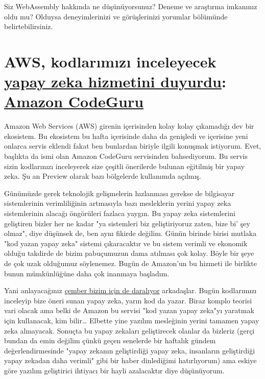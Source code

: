 \documentclass[11pt]{article}
\begin{document}
Siz WebAssembly hakkında ne düşünüyorsunuz? Deneme ve araştırma imkanınız oldu
mu? Olduysa deneyimlerinizi ve görüşlerinizi yorumlar bölümünde
belirtebilirsiniz.
\section{AWS, kodlarımızı inceleyecek \href{https://aws.amazon.com/about-aws/whats-new/2019/12/aws-announces-amazon-codeguru-for-automated-code-reviews-and-application-performance-recommendations/}{yapay zeka hizmetini duyurdu}: \href{https://aws.amazon.com/tr/codeguru/}{Amazon CodeGuru}}
\label{sec:orgfa6e881}
Amazon Web Services (AWS) girenin içerisinden kolay kolay çıkamadığı dev bir
ekosistem. Bu ekosistem bu hafta içerisinde daha da genişledi ve içerisine yeni
onlarca servis eklendi fakat ben bunlardan biriyle ilgili konuşmak istiyorum.
Evet, başlıkta da ismi olan Amazon CodeGuru servisinden bahsediyorum. Bu servis
sizin kodlarınızı inceleyerek size çeşitli önerilerde bulunan eğitilmiş bir
yapay zeka. Şu an Preview olarak bazı bölgelerde kullanımda açılmış.

Günümüzde gerek teknolojik gelişmelerin hızlanması gerekse de bilgisayar
sistemlerinin verimliliğinin artmasıyla bazı mesleklerin yerini yapay zeka
sistemlerinin alacağı öngörüleri fazlaca yaygın. Bu yapay zeka sistemlerini
geliştiren bizler her ne kadar "ya sistemleri biz geliştiriyoruz zaten, bize
bi' şey olmaz", diye düşünsek de, ben aynı fikirde değilim. Günün birinde
birisi mutlaka "kod yazan yapay zeka" sistemi çıkaracaktır ve bu sistem verimli
ve ekonomik olduğu takdirde de bizim pabuçumuzun dama atılması çok kolay. Böyle
bir şeye de çok uzak olduğumuz söylenemez. Bugün de Amazon'un bu hizmeti ile
birlikte bunun mümkünlüğüne daha çok inanmaya başladım.

Yani anlayacağınız \href{https://tr.pinterest.com/pin/363665738639735548/}{çember bizim için de daralıyor} arkadaşlar. Bugün kodlarımızı
inceleyip bize öneri sunan yapay zeka, yarın kod da yazar. Biraz komplo teorisi
vari olacak ama belki de Amazon bu servisi "kod yazan yapay zeka"yı yaratmak
için kullanacak, kim bilir\ldots{} Elbette yine yazılım mesleğinin yerini tamamen
yapay zeka almayacak. Sonuçta bu yapay zekaları geliştirecek olanlar da
bizleriz (gerçi bundan da emin değilim çünkü geçen senelerde bir haftalık
gündem değerlendirmesinde "yapay zekanın geliştirdiği yapay zeka, insanların
geliştirdiği yapay zekadan daha verimli" gibi bir haber dinlediğimi
hatırlıyorum) ama eskiye göre yazılım geliştirici ihtiyacı bir hayli
azalacaktır diye düşünüyorum.
\end{document}

